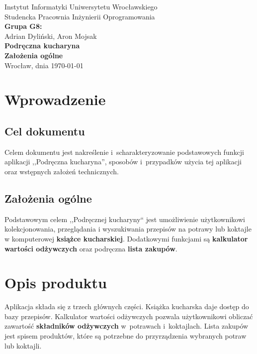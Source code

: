 \documentclass[a4paper,11pt,titlepage,twoside]{mwart}
\begin{document}
\begin{titlepage}
\begin{center}
\large{Instytut Informatyki Uniwersytetu Wrocławskiego\\Studencka Pracownia Inżynierii Oprogramowania}\\[3.0cm]
\Large {\bfseries Grupa G8:}\\
\large Adrian Dyliński, Aron Mojsak\\[4.0cm]
{ \Huge \bfseries Podręczna kucharyna}\\[0.5cm]
{ \large \bfseries Założenia ogólne}\\
\vfill
{\large Wrocław, dnia \today}
\end{center}
\end{titlepage}
\mbox{}
\thispagestyle{empty}
\newpage
\setcounter{page}{1}
\tableofcontents
\newpage
\section{Wprowadzenie}
  \subsection{Cel dokumentu}
  Celem dokumentu jest nakreślenie i~scharakteryzowanie podstawowych funkcji aplikacji ,,Podręczna kucharyna'', sposobów i~przypadków użycia tej aplikacji oraz wstępnych założeń technicznych.
  \subsection{Założenia ogólne}
  Podstawowym celem ,,Podręcznej kucharyny`` jest umożliwienie użytkownikowi kolekcjonowania, przeglądania i wyszukiwania przepisów na potrawy lub koktajle w komputerowej \textbf{książce kucharskiej}. Dodatkowymi funkcjami są \textbf{kalkulator wartości odżywczych} oraz podręczna \textbf{lista zakupów}.
\section{Opis produktu}
Aplikacja składa się z trzech głównych części. Książka kucharska daje dostęp do bazy przepisów. Kalkulator wartości odżywczych pozwala użytkownikowi obliczać zawartość \textbf{składników odżywczych} w~potrawach i~koktajlach. Lista zakupów jest spisem produktów, które są potrzebne do przyrządzenia wybranych potraw lub koktajli. 
\end{document}
